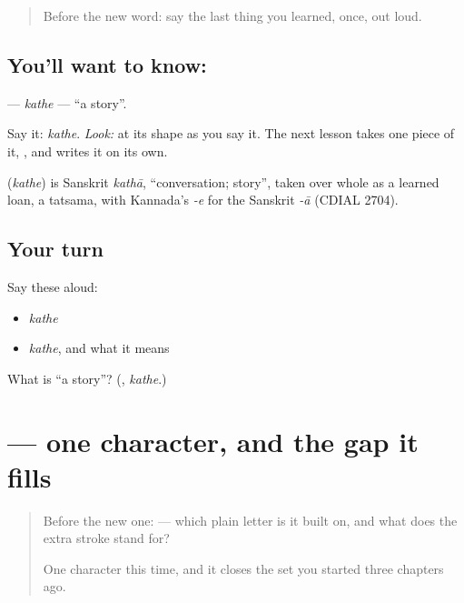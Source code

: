\begin{quote}
Before the new word: say the last thing you learned, once, out loud.
\end{quote}

\subsection*{You'll want to know: }
\textbf{} — \emph{kathe} — \textquotedblleft{}a story\textquotedblright{}.

Say it: \emph{kathe}. \emph{Look:} at its shape as you say it. The next lesson takes one piece of it, \textbf{}, and writes it on its own.

\begin{cousinweb}
\textbf{} (\emph{kathe}) is Sanskrit \emph{kathā}, \textquotedblleft{}conversation; story\textquotedblright{}, taken over whole as a learned loan, a tatsama, with Kannada's \emph{-e} for the Sanskrit \emph{-ā} (CDIAL 2704).
\end{cousinweb}

\subsection*{Your turn}
Say these aloud:

\begin{itemize}
\raggedright
  \item \emph{kathe}
  \item \emph{kathe}, and what it means
\end{itemize}

\begin{tcolorbox}[breakable,colback=teal!4,colframe=teal!35!black,title={Before you move on}]
What is \textquotedblleft{}a story\textquotedblright{}? (\textbf{}, \emph{kathe}.)
\end{tcolorbox}
\section[\texorpdfstring{\kn{ಥ} (tha)}{ಥ (tha)}]{ — one character, and the gap it fills}

\label{lesson:KA-S129-letter-tha}



\begin{quote}
Before the new one:  — which plain letter is it built on, and what does the extra stroke stand for?

One character this time, and it closes the set you started three chapters ago.
\end{quote}

